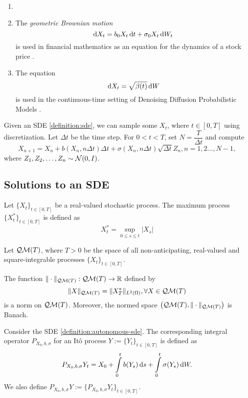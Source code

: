 \begin{example}
  \begin{enumerate}
    \item []
    \item The \textit{geometric Brownian motion}
          $$\,\mathrm{d} X_t = b_0X_t\,\mathrm{d} t +  \sigma_0 X_t\,\mathrm{d} W_t$$
          is used in financial mathematics as an equation for the dynamics of a stock price \cite{reddy2016simulating}.
    \item The equation
          $$\,\mathrm{d} X_t=\sqrt{\beta(t)}\,\mathrm{d} W$$
          is used in the continuous-time setting of Denoising Diffusion Probabilistic Models \cite{ho2020denoising}.
  \end{enumerate}
\end{example}

Given an SDE \ref{definition:sde}, we can sample some $X_t$, where $t\in[0,T]$ using discretization. Let $\Delta t$ be the time step. For $0<t<T$, set $N=\dfrac{T}{\Delta t}$ and compute
$$X_{n+1} = X_n + b(X_n, n\Delta t)\Delta t + \sigma(X_n, n\Delta t)\sqrt{\Delta t} Z_n, n = 1,2 \ldots, N-1,$$
where $Z_1,Z_2,\ldots, Z_n\sim\mathcal{N}(0,I)$.

\subsection{Solutions to an SDE}


\begin{definition}
  Let $\{X_t\}_{t\in[0,T]}$ be a real-valued stochastic process. The maximum process $\{X^*_t\}_{t\in[0,T]}$ is defined as
  $$X^*_t = \sup\limits_{0\le s\le t} |X_s|$$
\end{definition}

\begin{definition}
  Let $\mathcal{Q}\mathcal{M}(T)$, where $T>0$ be the space of all non-anticipating, real-valued and square-integrable processes $\{X_t\}_{t\in[0,T]}$.
\end{definition}

\begin{proposition}
  The function $\|\cdot\|_{\mathcal{Q}\mathcal{M}(T)}:\mathcal{Q}\mathcal{M}(T)\to\mathbb{R}$ defined by
  $$\|X\|_{\mathcal{Q}\mathcal{M}(T)} = \|X^*_T\|_{L^2(\Omega)},\forall X\in \mathcal{Q}\mathcal{M}(T)$$
  is a norm on $\mathcal{Q}\mathcal{M}(T)$. Moreover, the normed space $\left(\mathcal{Q}\mathcal{M}(T),\|\cdot\|_{\mathcal{Q}\mathcal{M}(T)}\right)$ is Banach.
\end{proposition}

\begin{definition}
  Consider the SDE \ref{definition:autonomous-sde}. The corresponding integral operator $P_{X_0,b,\sigma}$ for an Itô process $Y:=\{Y_t\}_{t\in[0,T]}$ is defined as
  \begin{equation}
    \label{equation:picard-operator}
    P_{X_0,b,\sigma} Y_t = X_0 + \int\limits_0^t b(Y_s)\,\mathrm{d} s + \int\limits_0^t \sigma(Y_s)\,\mathrm{d} W.
  \end{equation}
  We also define $P_{X_0,b,\sigma} Y := \{P_{X_0,b,\sigma} Y_t\}_{t\in[0,T]}$.
\end{definition}

